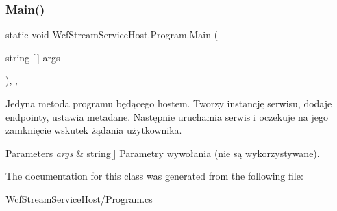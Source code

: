 \subsubsection{\texorpdfstring{Main()}{Main()}}
{\footnotesize\ttfamily static void Wcf\+Stream\+Service\+Host.\+Program.\+Main (\begin{DoxyParamCaption}\item[{string \mbox{[}$\,$\mbox{]}}]{args }\end{DoxyParamCaption})\hspace{0.3cm}{\ttfamily [inline]}, {\ttfamily [static]}, {\ttfamily [private]}}



Jedyna metoda programu będącego hostem. Tworzy instancję serwisu, dodaje endpointy, ustawia metadane. Następnie uruchamia serwis i oczekuje na jego zamknięcie wskutek żądania użytkownika. 


\begin{DoxyParams}{Parameters}
{\em args} & string\mbox{[}\mbox{]} Parametry wywołania (nie są wykorzystywane).\\
\hline
\end{DoxyParams}


The documentation for this class was generated from the following file\+:\begin{DoxyCompactItemize}
\item 
Wcf\+Stream\+Service\+Host/Program.\+cs\end{DoxyCompactItemize}
